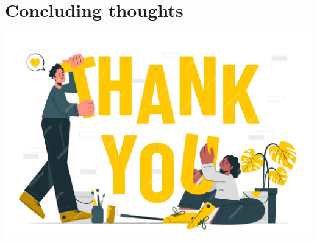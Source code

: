 	\section{Concluding thoughts}
	

	\begin{frame}
		\begin{center}
			\includegraphics[width=.8\textwidth]{./assets/thanks}
		\end{center}
	\end{frame}


